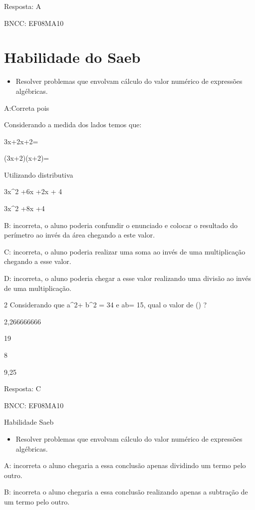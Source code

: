 Resposta: A

BNCC: EF08MA10

\section{Habilidade do Saeb}

\begin{itemize}
\tightlist

\item 
  Resolver problemas que envolvam cálculo do valor numérico de
  expressões algébricas.
\end{itemize}

A:Correta pois

Considerando a medida dos lados temos que:

3x+2\times x+2=

(3x+2)\times (x+2)=

Utilizando distributiva

3x^2 +6x +2x + 4

3x^2 +8x +4

B: incorreta, o aluno poderia confundir o enunciado e colocar o
resultado do perímetro ao invés da área chegando a este valor.

C: incorreta, o aluno poderia realizar uma soma ao invés de uma
multiplicação chegando a esse valor.

D: incorreta, o aluno poderia chegar a esse valor realizando uma divisão
ao invés de uma multiplicação.

\num{2} Considerando que a^2+ b^2 = 34 e ab= 15, qual o valor de
() ?

\item 2,266666666
\item 19
\item 8
\item 9,25

Resposta: C

BNCC: EF08MA10

Habilidade Saeb

\begin{itemize}
\tightlist

\item 
  Resolver problemas que envolvam cálculo do valor numérico de
  expressões algébricas.
\end{itemize}

A: incorreta o aluno chegaria a essa conclusão apenas dividindo um termo
pelo outro.

B: incorreta o aluno chegaria a essa conclusão realizando apenas a
subtração de um termo pelo outro.

